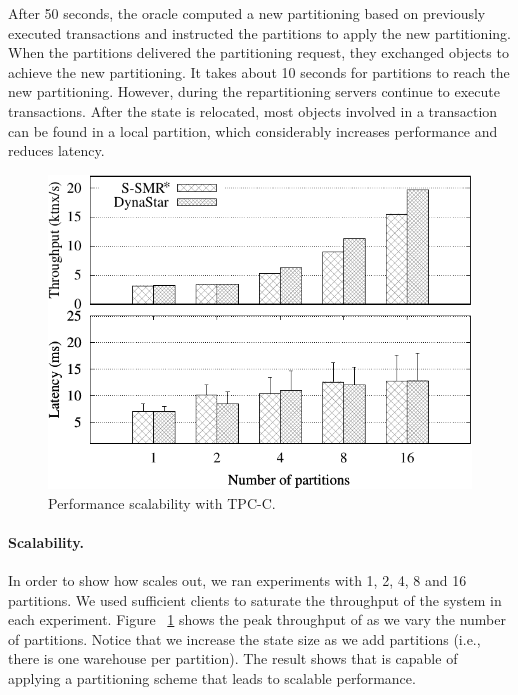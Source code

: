 
After 50 seconds, the oracle computed a new partitioning based on previously executed transactions and instructed the partitions to apply the new partitioning.
When the partitions delivered the partitioning request, they exchanged objects to achieve the new partitioning.
It takes about 10 seconds for partitions to reach the new partitioning.
However, during the repartitioning servers continue to execute transactions.
After the state is relocated, most objects involved in a transaction
can be found in a local partition, which considerably increases performance and reduces latency. 

\begin{figure}[ht!]
  \centering
    \includegraphics[width=\columnwidth]{figures/eurosys/tpcc-scaling-tp-lat.pdf}
  \caption{Performance scalability with TPC-C.}
  \label{fig:tpcc_scaling}
\end{figure}
\paragraph*{Scalability.}
In order to show how \dynastar scales out, we ran experiments with 1, 2, 4, 8 and 16 partitions. 
We used sufficient clients to  saturate the throughput of the system in each experiment. 
Figure ~\ref{fig:tpcc_scaling} shows the peak throughput of \dynastar as we vary the 
number of partitions. 
Notice that we increase the state size as we add partitions (i.e., there is one warehouse per partition).
The result shows that \dynastar is capable of applying
a partitioning scheme that leads to scalable performance.


